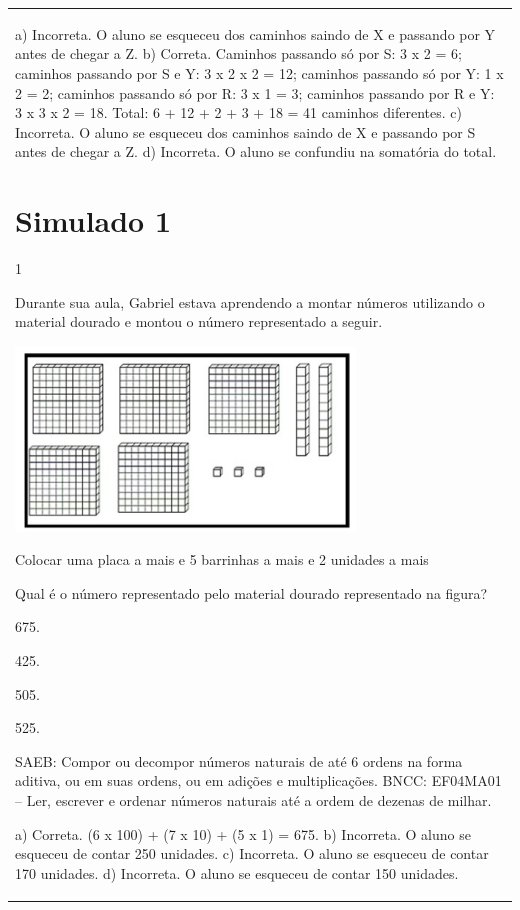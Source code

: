 \begin{mdframed}[linewidth=2pt,linecolor=salmao,roundcorner=2pt]
\begin{escolha}
{{{\begin{longtable}[]{@{}l@{}}
\begin{itemize}
{a) Incorreta. O aluno se esqueceu dos caminhos saindo de X e passando por Y antes de chegar a Z.
b) Correta. Caminhos passando só por S: 3 x 2 = 6; caminhos passando por S e Y: 3 x 2 x 2 = 12; caminhos passando só por Y: 1 x 2 = 2; caminhos passando só por R: 3 x 1 = 3; caminhos passando por R e Y: 3 x 3 x 2 = 18. Total: 6 + 12 + 2 + 3 + 18 = 41 caminhos diferentes.
c) Incorreta. O aluno se esqueceu dos caminhos saindo de X e passando por S antes de chegar a Z.
d) Incorreta. O aluno se confundiu na somatória do total.

\chapter{Simulado 1}
\markboth{Simulado 1}{}

\num{1}

Durante sua aula, Gabriel estava aprendendo a montar números utilizando o
material dourado e montou o número representado a seguir.

\includegraphics[width=3.55128in,height=1.93600in]{media/image142.png}

Colocar uma placa a mais e 5 barrinhas a mais e 2 unidades a mais

Qual é o número representado pelo material dourado representado na figura?

\begin{escolha}
\item
  675.
\item
  425.
\item
  505.
\item
  525.
\end{escolha}

SAEB: Compor ou decompor números naturais de até 6 ordens na forma aditiva, ou
em suas ordens, ou em adições e multiplicações.
BNCC: EF04MA01 -- Ler, escrever e ordenar números naturais até a ordem de dezenas de milhar.

a) Correta. (6 x 100) + (7 x 10) + (5 x 1) = 675.
b) Incorreta. O aluno se esqueceu de contar 250 unidades.
c) Incorreta. O aluno se esqueceu de contar 170 unidades.
d) Incorreta. O aluno se esqueceu de contar 150 unidades.

}
\end{itemize}
\end{longtable}}}}
\end{escolha}
\end{mdframed}
